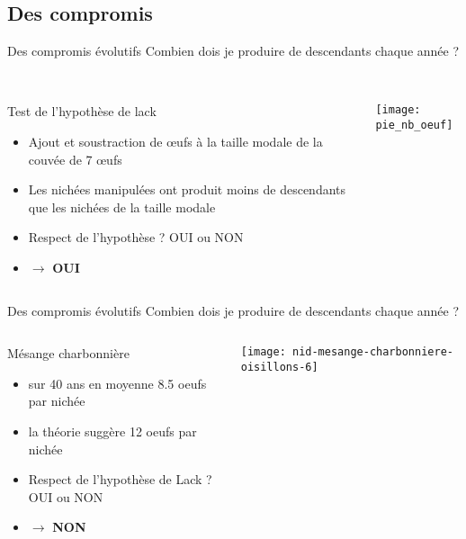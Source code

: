 \documentclass[10pt]{beamer}
\begin{document}
\subsection{Des compromis}



\begin{frame}{Des compromis évolutifs}
  Combien dois je produire de descendants chaque année ? \\~\\
\begin{columns}
    \begin{column}[c]{.5\textwidth}
      Test de l'hypothèse de lack
        \begin{itemize}[<+->]
        \item Ajout et soustraction de œufs à la taille modale de la couvée
de 7 œufs
        \item Les nichées manipulées ont produit moins de descendants
          que les nichées de la taille  modale 
        \item Respect de l'hypothèse ? OUI ou NON
        \item $\rightarrow$ \textbf{OUI}
        \end{itemize}
    \end{column}
    \begin{column}[c]{.5\textwidth}
      \begin{center}
      \texttt{[image: pie\_nb\_oeuf]}
       \end{center}
    \end{column}
  \end{columns}
\end{frame}



 
\begin{frame}{Des compromis évolutifs}
  Combien dois je produire de descendants chaque année ? 
  \begin{columns}
    \begin{column}[c]{.5\textwidth}
      Mésange charbonnière
      \begin{itemize}[<+->]
      \item sur 40 ans en moyenne 8.5 oeufs par nichée
      \item la théorie suggère 12 oeufs par nichée
      
      \item Respect de l'hypothèse de Lack ? OUI ou NON
      \item $\rightarrow$ \textbf{NON}
   
      \end{itemize}
    \end{column}
    \begin{column}[c]{.5\textwidth}
      \begin{center}
        \texttt{[image: nid-mesange-charbonniere-oisillons-6]}
      \end{center}
    \end{column}
  \end{columns}
\end{frame}
\end{document}
